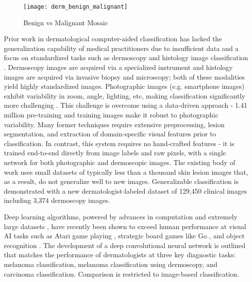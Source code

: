 \begin{figure}
\texttt{[image: derm\_benign\_malignant]}
\caption{Benign vs Malignant Mosaic}
\label{fig:derm_benign_malignant}
\end{figure}

Prior work in dermatological computer-aided classification \cite{masood2013computer, rosado2003accuracy, burroni2004melanoma} has lacked the generalization capability of medical practitioners due to insufficient data and a focus on standardized tasks such as dermoscopy \cite{kittler2002diagnostic, codella2015deep, codella2018skin} and histology image classification \cite{binder1998epiluminescence, altmeyer1997skin, clark1989model, schindewolf1993classification}. Dermoscopy images are acquired via a specialized instrument and histology images are acquired via invasive biopsy and microscopy; both of these modalities yield highly standardized images. Photographic images (e.g. smartphone images) exhibit variability in zoom, angle, lighting, etc, making classification significantly more challenging \cite{ramlakhan2011mobile, ballerini2013color}. This challenge is overcome using a data-driven approach - 1.41 million pre-training and training images make it robust to photographic variability. Many former techniques require extensive preprocessing, lesion segmentation, and extraction of domain-specific visual features prior to classification. In contrast, this system requires no hand-crafted features - it is trained end-to-end directly from image labels and raw pixels, with a single network for both photographic and dermoscopic images. The existing body of work uses small datasets of typically less than a thousand skin lesion images \cite{kittler2002diagnostic, codella2018skin, binder1998epiluminescence} that, as a result, do not generalize well to new images. Generalizable classification is demonstrated with a new dermatologist-labeled dataset of 129,450 clinical images including 3,374 dermoscopy images.

Deep learning algorithms, powered by advances in computation and extremely large datasets \cite{deng2009imagenet}, have recently been shown to exceed human performance at visual AI tasks such as Atari game playing \cite{mnih2015human}, strategic board games like Go \cite{silver2016mastering}, and object recognition \cite{russakovsky2015imagenet}. The development of a deep convolutional neural network is outlined that matches the performance of dermatologists at three key diagnostic tasks: melanoma classification, melanoma classification using dermoscopy, and carcinoma classification.  Comparison is restricted to image-based classification.

